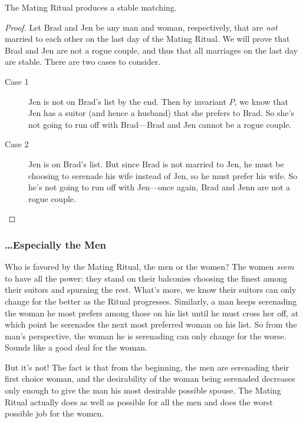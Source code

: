\begin{theorem}
The Mating Ritual produces a stable matching.
\end{theorem}

\begin{proof}
Let Brad and Jen be any man and woman, respectively, that are
\emph{not} married to each other on the last day of the Mating Ritual.
We will prove that Brad and Jen are not a rogue couple, and thus that
all marriages on the last day are stable.  There are two cases to consider.
\begin{description}

\item[Case 1] Jen is not on Brad's list by the end.  Then by invariant
  $P$, we know that Jen has a suitor (and hence a husband) that she
  prefers to Brad.  So she's not going to run off with Brad---Brad and
  Jen cannot be a rogue couple.

\item[Case 2] Jen is on Brad's list.  But since Brad is not married to
  Jen, he must be choosing to serenade his wife instead of Jen, so he
  must prefer his wife.  So he's not going to run off with Jen---once
  again, Brad and Jenn are not a rogue couple.
 \qedhere

\end{description}

\end{proof}


\subsubsection{\dots Especially the Men}

Who is favored by the Mating Ritual, the men or the women?  The women
\emph{seem} to have all the power: they stand on their balconies
choosing the finest among their suitors and spurning the rest.  What's
more, we know their suitors can only change for the better as the
Ritual progresses.  Similarly, a man keeps serenading the woman he
most prefers among those on his list until he must cross her off, at
which point he serenades the next most preferred woman on his list.  So
from the man's perspective, the woman he is serenading can only change
for the worse.  Sounds like a good deal for the woman.

But it's not!  The fact is that from the beginning, the men are
serenading their first choice woman, and the desirability of the woman
being serenaded decreases only enough to give the man his most
desirable possible spouse.  The Mating Ritual actually does as well as
possible for all the men and does the worst possible job for the
women.

